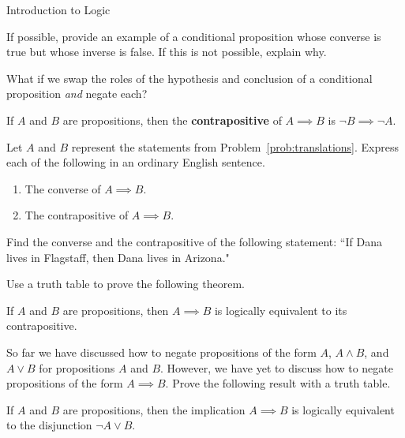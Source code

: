 \begin{section}{Introduction to Logic}
\begin{problem}\label{prob:converse and inverse}
If possible, provide an example of a conditional proposition whose converse is true but whose inverse is false. If this is not possible, explain why.
\end{problem}

What if we swap the roles of the hypothesis and conclusion of a conditional proposition \emph{and} negate each?

\begin{definition}
If $A$ and $B$ are propositions, then the \textbf{contrapositive} of $A \implies B$ is $\neg B \implies \neg A$.
\end{definition}

\begin{problem}
Let $A$ and $B$ represent the statements from Problem~\ref{prob:translations}.  Express each of the following in an ordinary English sentence.
\begin{enumerate}[label=\textrm{(\alph*)}]
\item The converse of $A \implies B$.
\item The contrapositive of $A \implies B$.
\end{enumerate}
\end{problem}

\begin{problem}
Find the converse and the contrapositive of the following statement: ``If Dana lives in Flagstaff, then Dana lives in Arizona."
\end{problem}

Use a truth table to prove the following theorem.

\begin{theorem}\label{thm:contrapos}
If $A$ and $B$ are propositions, then ${A\implies B}$ is logically equivalent to its contrapositive.
\end{theorem}

So far we have discussed how to negate propositions of the form $A$, $A\wedge B$, and $A\vee B$ for propositions $A$ and $B$.  However, we have yet to discuss how to negate propositions of the form $A\implies B$.  Prove the following result with a truth table.

\begin{theorem}\label{thm:ImplicationAsDisjuction}
If $A$ and $B$ are propositions, then the implication $A\implies B$ is logically equivalent to the disjunction $\neg A \vee B$.
\end{theorem}


\end{section}
